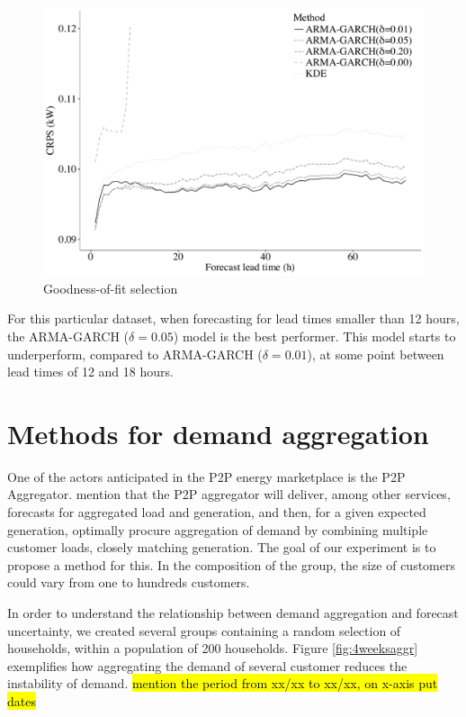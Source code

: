 \documentclass[preprint,3p,12pt,authoryear]{elsarticle}
\begin{document}
\begin{figure}
  \centering
  \includegraphics[width=0.8\columnwidth]{2017-10-13_big-gofmin_266_graylinesman.pdf}
  \caption{Goodness-of-fit selection}
  \label{fig:benchmark}
\end{figure}

For this particular dataset, when forecasting for lead times smaller than 12 hours, the ARMA-GARCH ($\delta = 0.05$) model is the best performer.
This model starts to underperform, compared to ARMA-GARCH ($\delta = 0.01$), at some point between lead times of 12 and 18 hours.


\section{Methods for demand aggregation}
\label{sec:load_aggr}
One of the  actors anticipated in the P2P energy marketplace is the P2P Aggregator. \citet{pouttu2017p2p} mention that the P2P aggregator will deliver, among other services, forecasts for aggregated load and generation, and then, for a given expected generation, optimally procure aggregation of demand by combining multiple customer loads, closely matching generation. The goal of our experiment is to propose a method for this. In the composition of the group, the size of customers could vary from one to hundreds customers.

In order to understand the relationship between demand aggregation and forecast uncertainty, we created several groups containing a random selection of households, within a population of 200 households.
Figure \ref{fig:4weeksaggr} exemplifies how aggregating the demand of several customer reduces the instability of demand.
\hl{mention the period from xx/xx to xx/xx, on x-axis put dates}
\end{document}
